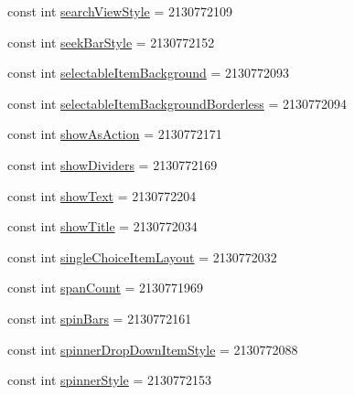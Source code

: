 \begin{DoxyCompactItemize}
\item 
const int \mbox{\hyperlink{class_f_w_p_s___app_1_1_droid_1_1_resource_1_1_attribute_a6c6c9bdad7e9518ca964567f750c37ef}{search\+View\+Style}} = 2130772109
\item 
const int \mbox{\hyperlink{class_f_w_p_s___app_1_1_droid_1_1_resource_1_1_attribute_a00a907c8f8002b884fd632ce78c6c0f1}{seek\+Bar\+Style}} = 2130772152
\item 
const int \mbox{\hyperlink{class_f_w_p_s___app_1_1_droid_1_1_resource_1_1_attribute_aec2e4f2f35781cbe70d880a527c9559d}{selectable\+Item\+Background}} = 2130772093
\item 
const int \mbox{\hyperlink{class_f_w_p_s___app_1_1_droid_1_1_resource_1_1_attribute_a5a3b73988a461678599e13caf382ed10}{selectable\+Item\+Background\+Borderless}} = 2130772094
\item 
const int \mbox{\hyperlink{class_f_w_p_s___app_1_1_droid_1_1_resource_1_1_attribute_adc9ba32c97a257b70dd76f5f5ec6e7a1}{show\+As\+Action}} = 2130772171
\item 
const int \mbox{\hyperlink{class_f_w_p_s___app_1_1_droid_1_1_resource_1_1_attribute_a7d5587b958dc1e04402f9fd1516b7ee0}{show\+Dividers}} = 2130772169
\item 
const int \mbox{\hyperlink{class_f_w_p_s___app_1_1_droid_1_1_resource_1_1_attribute_a8e6be8ebd6a1bc5acf1d9bc8c1d9f192}{show\+Text}} = 2130772204
\item 
const int \mbox{\hyperlink{class_f_w_p_s___app_1_1_droid_1_1_resource_1_1_attribute_af6eb00e0b370b8573135da3a16d70fcc}{show\+Title}} = 2130772034
\item 
const int \mbox{\hyperlink{class_f_w_p_s___app_1_1_droid_1_1_resource_1_1_attribute_a827b8f5620e44980431414efd127b4bc}{single\+Choice\+Item\+Layout}} = 2130772032
\item 
const int \mbox{\hyperlink{class_f_w_p_s___app_1_1_droid_1_1_resource_1_1_attribute_ad60479c532e73f669abb8e1c92b3879e}{span\+Count}} = 2130771969
\item 
const int \mbox{\hyperlink{class_f_w_p_s___app_1_1_droid_1_1_resource_1_1_attribute_a313605fafbf6c3d88548a7d190f6ad23}{spin\+Bars}} = 2130772161
\item 
const int \mbox{\hyperlink{class_f_w_p_s___app_1_1_droid_1_1_resource_1_1_attribute_a518dc7289ec33640e8a73273081eeb44}{spinner\+Drop\+Down\+Item\+Style}} = 2130772088
\item 
const int \mbox{\hyperlink{class_f_w_p_s___app_1_1_droid_1_1_resource_1_1_attribute_a1ed6acc57f11847e030942f87ac94fc8}{spinner\+Style}} = 2130772153

\end{DoxyCompactItemize}
